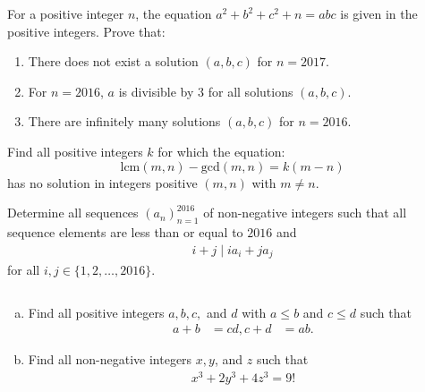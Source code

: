\documentclass[problems.tex]{subfile}
\begin{document}
	\begin{problem}
		For a positive integer $n$, the equation $a^2 + b^2 + c^2 + n = abc$ is given in the positive integers.
		Prove that:
		\begin{enumerate}
			\item There does not exist a solution $(a, b, c)$ for $n = 2017$.
			\item For $n = 2016$, $a$ is divisible by $3$ for all solutions $(a, b, c)$.
			\item There are infinitely many solutions $(a, b, c)$ for $n = 2016$.
		\end{enumerate}
	\end{problem}

	\begin{problem}
		Find all positive integers $k$ for which the equation: $$ \text{lcm}(m,n)-\text{gcd}(m,n)=k(m-n)$$has no solution in integers positive $(m,n)$ with $m\neq n$. %
	\end{problem}

	\begin{problem}
		Determine all sequences $(a_n)_{n=1}^{2016}$ of non-negative integers such that all sequence elements are less than or equal to $2016$ and
		\begin{align*}
			i+j \mid ia_i + ja_j
		\end{align*}
		for all $i,j \in \{1, 2, \dots, 2016\}$.
	\end{problem}

	\begin{problem} $ $
		\begin{enumerate}[(a)]
			\item Find all positive integers $a, b, c,$ and $d$ with $a \leq b$ and $c \leq d$ such that
			\begin{align*}
				a + b &= cd,
				c + d &= ab.
			\end{align*}
			\item Find all non-negative integers $x, y$, and $z$ such that
			\begin{align*}
				x^3 + 2y^3 + 4z^3 = 9!
			\end{align*}
		\end{enumerate}
	\end{problem}
\end{document}
